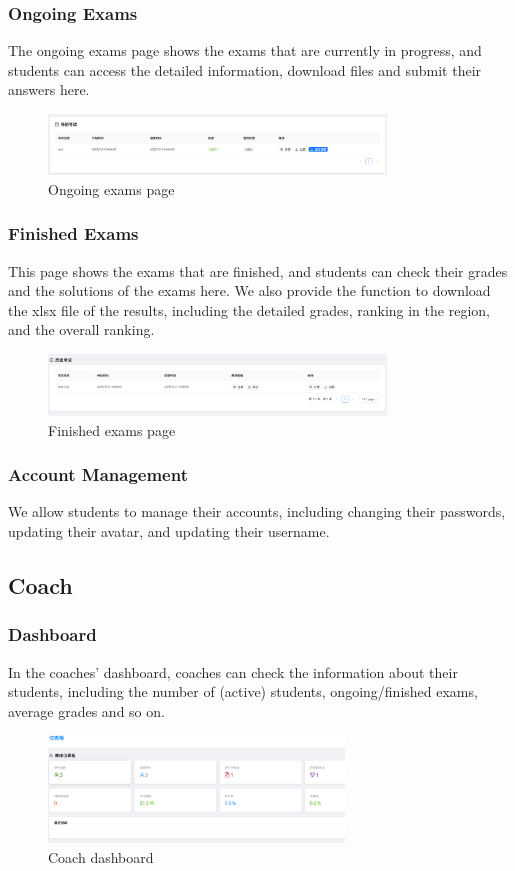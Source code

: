 \documentclass[12pt]{article}
\begin{document}
\subsubsection{Ongoing Exams}
The ongoing exams page shows the exams that are currently in progress, and students can access the detailed information,
download files and submit their answers here.
\begin{figure}[H]
    \centering
    \includegraphics[width=0.8\textwidth]{student/test-ing.png}
    \caption{Ongoing exams page}
    \label{fig:OngoingExams page}
\end{figure}
\subsubsection{Finished Exams}
This page shows the exams that are finished, and students can check their grades and the solutions of the exams here.
We also provide the function to download the xlsx file of the results, including the detailed grades, ranking in the region, and the overall ranking.
\begin{figure}[H]
    \centering
    \includegraphics[width=0.8\textwidth]{student/test-his.png}
    \caption{Finished exams page}
    \label{fig:FinishedExams page}
\end{figure}
\subsubsection{Account Management}
We allow students to manage their accounts, including changing their passwords, updating their avatar, and updating their username.
\subsection{Coach}
\subsubsection{Dashboard}
In the coaches' dashboard, coaches can check the information about their students, including the number of (active) students, ongoing/finished exams,
average grades and so on.
\begin{figure}[H]
    \centering
    \includegraphics[width=0.7\textwidth]{coach/dashboard.png}
    \caption{Coach dashboard}
    \label{fig:CoachDashboard page}
\end{figure}
\end{document}
